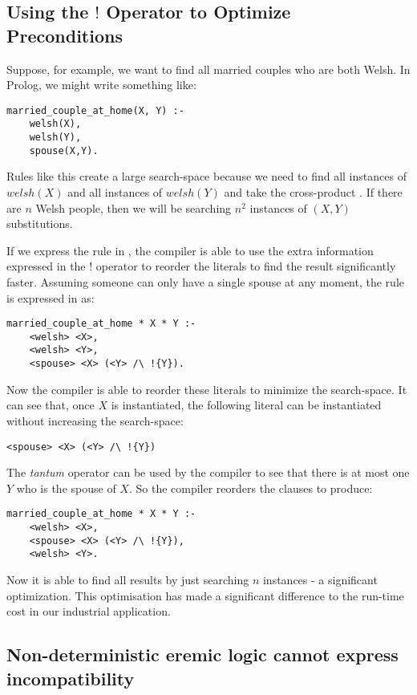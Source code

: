 \subsection{Using the $!$ Operator to Optimize Preconditions}
\label{optimizingpreconditions}
Suppose, for example, we want to find all married couples who are both Welsh.
In Prolog, we might write something like:
\begin{verbatim}
married_couple_at_home(X, Y) :-
    welsh(X),
    welsh(Y),
    spouse(X,Y).
\end{verbatim}	
Rules like this create a large search-space because we need to find all instances of $welsh(X)$ and all instances of  $welsh(Y)$ and take the cross-product \cite{smith-and-genesereth}. If there are $n$ Welsh people, then we will be searching $n^2$ instances of $(X,Y)$ substitutions.

If we express the rule in \ELFULL{}, the compiler is able to use the extra information expressed in the $!$ operator to reorder the literals to find the result significantly faster.
Assuming someone can only have a single spouse at any moment, the rule is expressed in \ELFULL{} as:
\begin{verbatim}
married_couple_at_home * X * Y :-
    <welsh> <X>,
    <welsh> <Y>,
    <spouse> <X> (<Y> /\ !{Y}).
\end{verbatim}	
Now the compiler is able to reorder these literals to minimize the search-space. 
It can see that, once $X$ is instantiated, the following literal can be instantiated without increasing the search-space:
\begin{verbatim}
<spouse> <X> (<Y> /\ !{Y})
\end{verbatim}
The \emph{tantum} operator can be used by the compiler to see that there is at most one $Y$ who is the spouse of $X$.
So the compiler reorders the clauses to produce:
\begin{verbatim}
married_couple_at_home * X * Y :-
    <welsh> <X>,
    <spouse> <X> (<Y> /\ !{Y}),
    <welsh> <Y>.
\end{verbatim}	
Now it is able to find all results by just searching $n$ instances - a significant optimization.
This optimisation has made a significant difference to the run-time cost in our industrial application.


\subsection{Non-deterministic eremic logic cannot express incompatibility}

